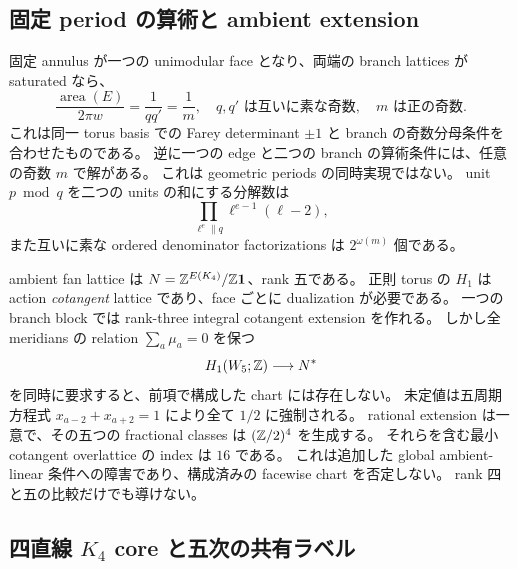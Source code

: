 \documentclass[11pt,a4paper]{article}
\begin{document}
\subsection{固定 period の算術と ambient extension}

固定 annulus が一つの unimodular face となり、両端の branch lattices が saturated なら、
\[
 \frac{\operatorname{area}(E)}{2\pi w}=\frac1{qq'}=\frac1m,
 \quad q,q'\text{ は互いに素な奇数},\quad m\text{ は正の奇数}.
\]
これは同一 torus basis での Farey determinant $\pm1$ と branch の奇数分母条件を合わせたものである。
逆に一つの edge と二つの branch の算術条件には、任意の奇数 $m$ で解がある。
これは geometric periods の同時実現ではない。
unit $p\bmod q$ を二つの units の和にする分解数は
\[
 \prod_{\ell^e\parallel q}\ell^{e-1}(\ell-2),
\]
また互いに素な ordered denominator factorizations は $2^{\omega(m)}$ 個である。

ambient fan lattice は $N=\mathbb Z^{E(K_4)}/\mathbb Z\mathbf1$、rank 五である。
正則 torus の $H_1$ は action \emph{cotangent} lattice であり、face ごとに dualization が必要である。
一つの branch block では rank-three integral cotangent extension を作れる。
しかし全 meridians の relation $\sum_a\mu_a=0$ を保つ
\[
 H_1(W_5;\mathbb Z)\longrightarrow N^*
\]
を同時に要求すると、前項で構成した chart には存在しない。
未定値は五周期方程式 $x_{a-2}+x_{a+2}=1$ により全て $1/2$ に強制される。
rational extension は一意で、その五つの fractional classes は $(\mathbb Z/2)^4$ を生成する。
それらを含む最小 cotangent overlattice の index は $16$ である。
これは追加した global ambient-linear 条件への障害であり、構成済みの facewise chart を否定しない。
rank 四と五の比較だけでも導けない。

\subsection{四直線 \texorpdfstring{$K_4$}{K4} core と五次の共有ラベル}
\end{document}
